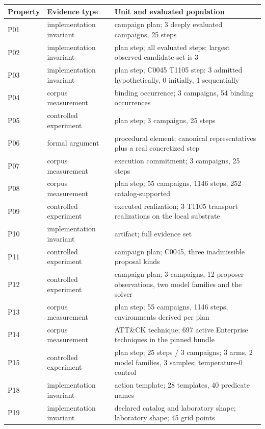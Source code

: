 \begin{tabularx}{\columnwidth}{@{}llL@{}}
\toprule
\textbf{Property} & \textbf{Evidence type} & \textbf{Unit and evaluated population} \\
\midrule
P01 & implementation invariant & campaign plan; 3 deeply evaluated campaigns, 25 steps \\
P02 & implementation invariant & plan step; all evaluated steps; largest observed candidate set is 3 \\
P03 & implementation invariant & plan step; C0045 T1105 step: 3 admitted hypothetically, 0 initially, 1 sequentially \\
P04 & corpus measurement & binding occurrence; 3 campaigns, 54 binding occurrences \\
P05 & controlled experiment & plan step; 3 campaigns, 25 steps \\
P06 & formal argument & procedural element; canonical representatives plus a real concretized step \\
P07 & corpus measurement & execution commitment; 3 campaigns, 25 steps \\
P08 & corpus measurement & plan step; 55 campaigns, 1146 steps, 252 catalog-supported \\
P09 & controlled experiment & executed realization; 3 T1105 transport realizations on the local substrate \\
P10 & implementation invariant & artifact; full evidence set \\
P11 & controlled experiment & campaign plan; C0045, three inadmissible proposal kinds \\
P12 & controlled experiment & campaign plan; 3 campaigns, 12 proposer observations, two model families and the solver \\
P13 & corpus measurement & plan step; 55 campaigns, 1146 steps, environments derived per plan \\
P14 & corpus measurement & ATT\&CK technique; 697 active Enterprise techniques in the pinned bundle \\
P15 & controlled experiment & plan step; 25 steps / 3 campaigns; 3 arms, 2 model families, 3 samples; temperature-0 control \\
P18 & implementation invariant & action template; 28 templates, 40 predicate names \\
P19 & implementation invariant & declared catalog and laboratory shape; laboratory shape; 45 grid points \\

\end{tabularx}
